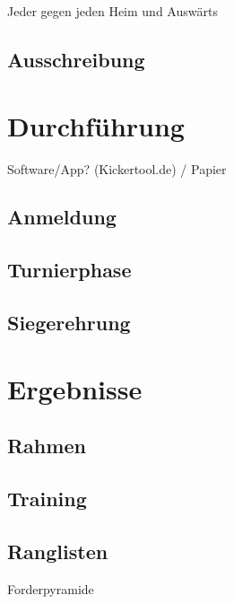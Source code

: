 Jeder gegen jeden
Heim und Auswärts


\subsection{Ausschreibung}
\label{turniere:vorbereitung:ausschreibung}

\section{Durchführung}
\label{turniere:durchfuehrung}
Software/App? (Kickertool.de) / Papier

\subsection{Anmeldung}
\label{turniere:durchfuehrung:anmeldung}

\subsection{Turnierphase}
\label{turniere:durchfuehrung:turnierphase}

\subsection{Siegerehrung}
\label{turniere:durchfuehrung:siegerehrung}





\section{Ergebnisse}
\label{turniere:ergebnisse}

\subsection{Rahmen}
\label{turniere:ergebnisse:rahmen}

\subsection{Training}
\label{turniere:ergebnisse:rahmen:training}

\subsection{Ranglisten}
\label{turniere:ergebnisse:rahmen:rangliste}
Forderpyramide

